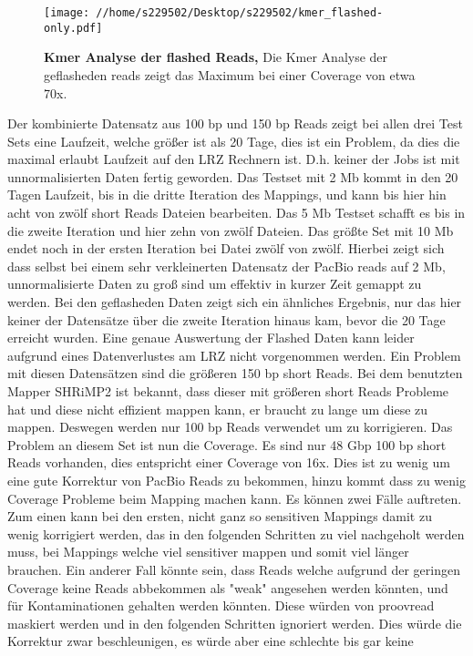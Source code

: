 \documentclass{scrartcl}
\begin{document}
\begin{figure}
\texttt{[image: //home/s229502/Desktop/s229502/kmer\_flashed-only.pdf]}
\caption[Kmer Analyse der flashed Reads]{\textbf{Kmer Analyse der flashed Reads,} Die Kmer Analyse der geflasheden reads zeigt das Maximum bei einer Coverage von etwa 70x.}
\end{figure}

Der kombinierte Datensatz aus 100 bp und 150 bp Reads zeigt bei allen drei Test Sets eine Laufzeit, welche größer ist als 20 Tage, dies ist
ein Problem, da dies die maximal erlaubt Laufzeit auf den LRZ Rechnern ist. D.h. keiner der Jobs ist mit unnormalisierten Daten fertig geworden. 
Das Testset mit 2 Mb kommt in den 20 Tagen Laufzeit, bis in die dritte Iteration des Mappings, und kann bis hier hin acht von zwölf 
short Reads Dateien bearbeiten. Das 5 Mb Testset schafft es bis in die zweite Iteration und hier zehn von zwölf Dateien. Das größte 
Set mit 10 Mb endet noch in der ersten Iteration bei Datei zwölf von zwölf. Hierbei zeigt sich dass selbst bei einem sehr verkleinerten
Datensatz der PacBio reads auf 2 Mb, unnormalisierte Daten zu groß sind um effektiv in kurzer Zeit gemappt zu werden. 
Bei den geflasheden Daten zeigt sich ein ähnliches Ergebnis, nur das hier keiner der Datensätze über die zweite Iteration hinaus kam, bevor die
20 Tage erreicht wurden. Eine genaue Auswertung der Flashed Daten kann leider aufgrund eines Datenverlustes am LRZ nicht vorgenommen werden.
Ein Problem mit diesen Datensätzen sind die größeren 150 bp short Reads. Bei dem benutzten Mapper SHRiMP2 ist bekannt, dass dieser mit größeren
short Reads Probleme hat und diese nicht effizient mappen kann, er braucht zu lange um diese zu mappen. Deswegen werden nur 100 bp Reads verwendet 
um zu korrigieren. Das Problem an diesem Set ist nun die Coverage. Es sind nur 48 Gbp 100 bp short Reads vorhanden, dies entspricht einer Coverage von
16x. Dies ist zu wenig um eine gute Korrektur von PacBio Reads zu bekommen, hinzu kommt dass zu wenig Coverage Probleme beim Mapping machen kann. Es können
zwei Fälle auftreten. Zum einen kann bei den ersten, nicht ganz so sensitiven Mappings damit zu wenig korrigiert werden, das in den folgenden Schritten zu viel
nachgeholt werden muss, bei Mappings welche viel sensitiver mappen und somit viel länger brauchen. Ein anderer Fall könnte sein, dass Reads welche aufgrund 
der geringen Coverage keine Reads abbekommen als "weak" angesehen werden könnten, und für Kontaminationen gehalten werden könnten. Diese würden von proovread
maskiert werden und in den folgenden Schritten ignoriert werden. Dies würde die Korrektur zwar beschleunigen, es würde aber eine schlechte bis gar keine 
\end{document}
